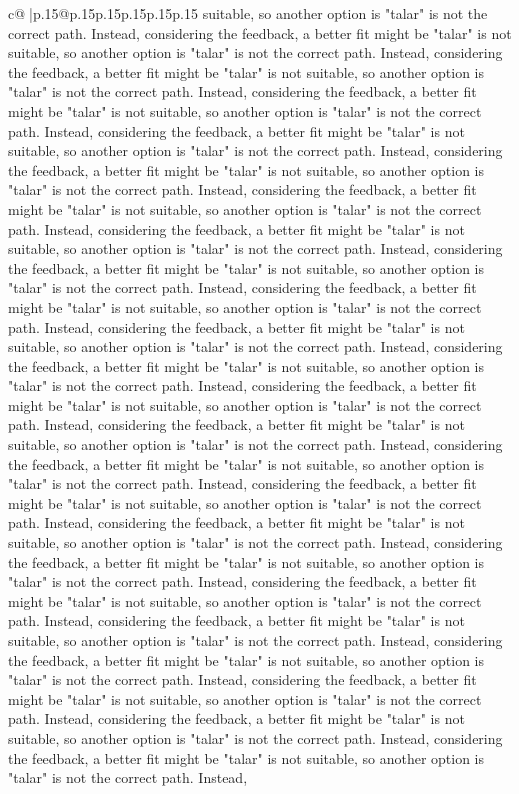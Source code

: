 \documentclass{article}
\begin{document}
{\begin{supertabular}{c@{$\;$}|p{.15\linewidth}@{}p{.15\linewidth}p{.15\linewidth}p{.15\linewidth}p{.15\linewidth}p{.15\linewidth}}
{{{suitable, so another option is "talar" is not the correct path. Instead, considering the feedback, a better fit might be "talar" is not suitable, so another option is "talar" is not the correct path. Instead, considering the feedback, a better fit might be "talar" is not suitable, so another option is "talar" is not the correct path. Instead, considering the feedback, a better fit might be "talar" is not suitable, so another option is "talar" is not the correct path. Instead, considering the feedback, a better fit might be "talar" is not suitable, so another option is "talar" is not the correct path. Instead, considering the feedback, a better fit might be "talar" is not suitable, so another option is "talar" is not the correct path. Instead, considering the feedback, a better fit might be "talar" is not suitable, so another option is "talar" is not the correct path. Instead, considering the feedback, a better fit might be "talar" is not suitable, so another option is "talar" is not the correct path. Instead, considering the feedback, a better fit might be "talar" is not suitable, so another option is "talar" is not the correct path. Instead, considering the feedback, a better fit might be "talar" is not suitable, so another option is "talar" is not the correct path. Instead, considering the feedback, a better fit might be "talar" is not suitable, so another option is "talar" is not the correct path. Instead, considering the feedback, a better fit might be "talar" is not suitable, so another option is "talar" is not the correct path. Instead, considering the feedback, a better fit might be "talar" is not suitable, so another option is "talar" is not the correct path. Instead, considering the feedback, a better fit might be "talar" is not suitable, so another option is "talar" is not the correct path. Instead, considering the feedback, a better fit might be "talar" is not suitable, so another option is "talar" is not the correct path. Instead, considering the feedback, a better fit might be "talar" is not suitable, so another option is "talar" is not the correct path. Instead, considering the feedback, a better fit might be "talar" is not suitable, so another option is "talar" is not the correct path. Instead, considering the feedback, a better fit might be "talar" is not suitable, so another option is "talar" is not the correct path. Instead, considering the feedback, a better fit might be "talar" is not suitable, so another option is "talar" is not the correct path. Instead, considering the feedback, a better fit might be "talar" is not suitable, so another option is "talar" is not the correct path. Instead, considering the feedback, a better fit might be "talar" is not suitable, so another option is "talar" is not the correct path. Instead, considering the feedback, a better fit might be "talar" is not suitable, so another option is "talar" is not the correct path. Instead, considering the feedback, a better fit might be "talar" is not suitable, so another option is "talar" is not the correct path. Instead, considering the feedback, a better fit might be "talar" is not suitable, so another option is "talar" is not the correct path. Instead, }}}
\end{supertabular}}
\end{document}
